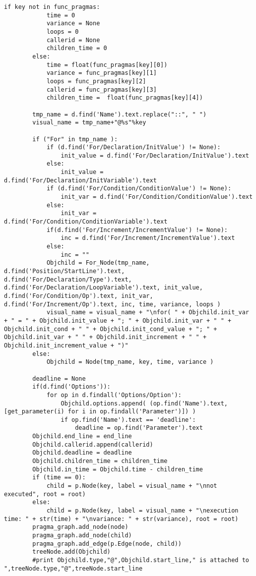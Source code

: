\documentclass[a4paper,10pt,twoside]{book}
\begin{document}
\begin{lstlisting}[language=CCC, caption=pargraph.py]
		if key not in func_pragmas:
			time = 0
			variance = None
			loops = 0
			callerid = None
			children_time = 0
		else:
			time = float(func_pragmas[key][0])
			variance = func_pragmas[key][1]
			loops = func_pragmas[key][2]
			callerid = func_pragmas[key][3]
			children_time =  float(func_pragmas[key][4])

		tmp_name = d.find('Name').text.replace("::", " ")
		visual_name = tmp_name+"@%s"%key

		if ("For" in tmp_name ):
			if (d.find('For/Declaration/InitValue') != None):
				init_value = d.find('For/Declaration/InitValue').text
			else:
				init_value = d.find('For/Declaration/InitVariable').text
			if (d.find('For/Condition/ConditionValue') != None):
				init_var = d.find('For/Condition/ConditionValue').text
			else:
				init_var = d.find('For/Condition/ConditionVariable').text
			if(d.find('For/Increment/IncrementValue') != None):
				inc = d.find('For/Increment/IncrementValue').text
			else:
				inc = ""
			Objchild = For_Node(tmp_name, d.find('Position/StartLine').text, d.find('For/Declaration/Type').text, d.find('For/Declaration/LoopVariable').text, init_value, d.find('For/Condition/Op').text, init_var, d.find('For/Increment/Op').text, inc, time, variance, loops )
			visual_name = visual_name + "\nfor( " + Objchild.init_var + " = " + Objchild.init_value + "; " + Objchild.init_var + " " + Objchild.init_cond + " " + Objchild.init_cond_value + "; " + Objchild.init_var + " " + Objchild.init_increment + " " + Objchild.init_increment_value + ")"
		else:
			Objchild = Node(tmp_name, key, time, variance )

		deadline = None
		if(d.find('Options')):
			for op in d.findall('Options/Option'):
				Objchild.options.append( (op.find('Name').text,[get_parameter(i) for i in op.findall('Parameter')]) )
				if op.find('Name').text == 'deadline':
					deadline = op.find('Parameter').text
		Objchild.end_line = end_line
		Objchild.callerid.append(callerid)
		Objchild.deadline = deadline
		Objchild.children_time = children_time
		Objchild.in_time = Objchild.time - children_time
		if (time == 0):
			child = p.Node(key, label = visual_name + "\nnot executed", root = root)
		else:
			child = p.Node(key, label = visual_name + "\nexecution time: " + str(time) + "\nvariance: " + str(variance), root = root)
		pragma_graph.add_node(node)
		pragma_graph.add_node(child)
		pragma_graph.add_edge(p.Edge(node, child))
		treeNode.add(Objchild)
		#print Objchild.type,"@",Objchild.start_line," is attached to ",treeNode.type,"@",treeNode.start_line


\end{lstlisting}
\end{document}
